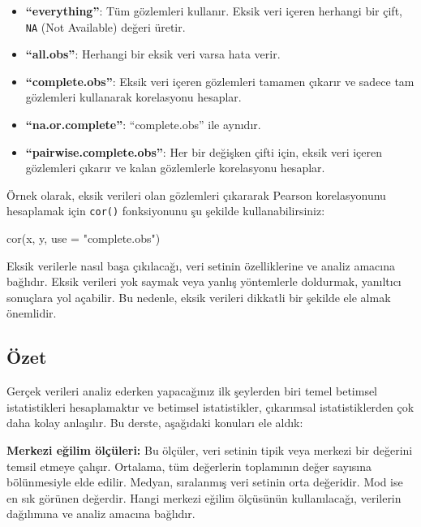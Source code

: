 \documentclass[
  letterpaper,
  DIV=11,
  numbers=noendperiod]{scrartcl}
\newenvironment{Shaded}{\begin{snugshade}}{\end{snugshade}}
\newcommand{\AttributeTok}[1]{\textcolor[rgb]{0.40,0.45,0.13}{#1}}
\newcommand{\FunctionTok}[1]{\textcolor[rgb]{0.28,0.35,0.67}{#1}}
\newcommand{\NormalTok}[1]{\textcolor[rgb]{0.00,0.23,0.31}{#1}}
\newcommand{\StringTok}[1]{\textcolor[rgb]{0.13,0.47,0.30}{#1}}
\providecommand{\tightlist}{%
  \setlength{\itemsep}{0pt}\setlength{\parskip}{0pt}}\usepackage{longtable,booktabs,array}
\begin{document}
\begin{tcolorbox}
\begin{itemize}
\tightlist
\item
  \textbf{``everything''}: Tüm gözlemleri kullanır. Eksik veri içeren
  herhangi bir çift, \texttt{NA} (Not Available) değeri üretir.
\item
  \textbf{``all.obs''}: Herhangi bir eksik veri varsa hata verir.
\item
  \textbf{``complete.obs''}: Eksik veri içeren gözlemleri tamamen
  çıkarır ve sadece tam gözlemleri kullanarak korelasyonu hesaplar.
\item
  \textbf{``na.or.complete''}: ``complete.obs'' ile aynıdır.
\item
  \textbf{``pairwise.complete.obs''}: Her bir değişken çifti için, eksik
  veri içeren gözlemleri çıkarır ve kalan gözlemlerle korelasyonu
  hesaplar.
\end{itemize}

Örnek olarak, eksik verileri olan gözlemleri çıkararak Pearson
korelasyonunu hesaplamak için \texttt{cor()} fonksiyonunu şu şekilde
kullanabilirsiniz:

\begin{Shaded}
\begin{Highlighting}[]
\FunctionTok{cor}\NormalTok{(x, y, }\AttributeTok{use =} \StringTok{"complete.obs"}\NormalTok{)}
\end{Highlighting}
\end{Shaded}

Eksik verilerle nasıl başa çıkılacağı, veri setinin özelliklerine ve
analiz amacına bağlıdır. Eksik verileri yok saymak veya yanlış
yöntemlerle doldurmak, yanıltıcı sonuçlara yol açabilir. Bu nedenle,
eksik verileri dikkatli bir şekilde ele almak önemlidir.

\end{tcolorbox}

\hypertarget{uxf6zet}{%
\subsection{Özet}\label{uxf6zet}}

Gerçek verileri analiz ederken yapacağınız ilk şeylerden biri temel
betimsel istatistikleri hesaplamaktır ve betimsel istatistikler,
çıkarımsal istatistiklerden çok daha kolay anlaşılır. Bu derste,
aşağıdaki konuları ele aldık:

\textbf{Merkezi eğilim ölçüleri:} Bu ölçüler, veri setinin tipik veya
merkezi bir değerini temsil etmeye çalışır. Ortalama, tüm değerlerin
toplamının değer sayısına bölünmesiyle elde edilir. Medyan, sıralanmış
veri setinin orta değeridir. Mod ise en sık görünen değerdir. Hangi
merkezi eğilim ölçüsünün kullanılacağı, verilerin dağılımına ve analiz
amacına bağlıdır.
\end{document}
